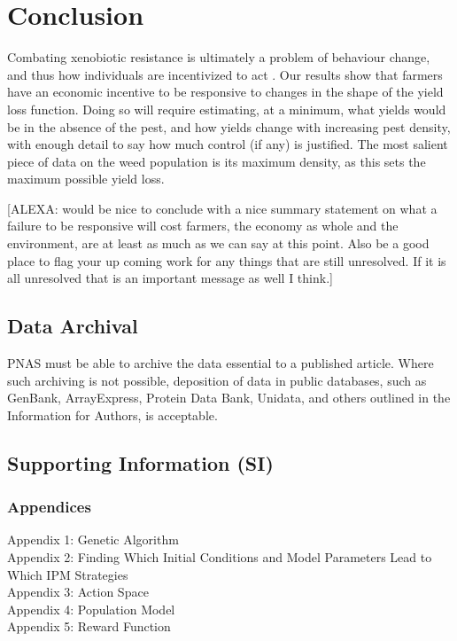 \documentclass[12pt, a4paper]{article}
\begin{document}
\section*{Conclusion}
Combating xenobiotic resistance is ultimately a problem of behaviour change, and thus how individuals are incentivized to act \citep{Hurl2016}. Our results show that farmers have an economic incentive to be responsive to changes in the shape of the yield loss function. Doing so will require estimating, at a minimum, what yields would be in the absence of the pest, and how yields change with increasing pest density, with enough detail to say how much control (if any) is justified. The most salient piece of data on the weed population is its maximum density, as this sets the maximum possible yield loss.      

[ALEXA: would be nice to conclude with a nice summary statement on what a failure to be responsive will cost farmers, the economy as whole and the environment, are at least as much as we can say at this point. Also be a good place to flag your up coming work for any things that are still unresolved. If it is all unresolved that is an important message as well I think.] 

\subsection*{Data Archival}

PNAS must be able to archive the data essential to a published article. Where such archiving is not possible, deposition of data in public databases, such as GenBank, ArrayExpress, Protein Data Bank, Unidata, and others outlined in the Information for Authors, is acceptable.

\subsection*{Supporting Information (SI)}
\subsubsection*{Appendices}
Appendix 1: Genetic Algorithm\\
Appendix 2: Finding Which Initial Conditions and Model Parameters Lead to Which IPM Strategies\\
Appendix 3: Action Space\\
Appendix 4: Population Model\\
Appendix 5: Reward Function\\
\end{document}

